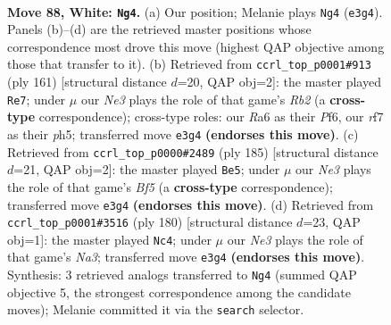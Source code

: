 \documentclass[11pt]{article}
\begin{document}
\clearpage

\begin{figure}[p]\centering
\begin{subfigure}{0.46\textwidth}\centering
\resizebox{\linewidth}{!}{%
\newchessgame
\chessboard[
  setfen={1R6/5rbk/R1P5/8/7K/4N3/8/8 w - - 15 88},
  showmover=false,
  pgfstyle=straightmove, color=movearrow, markmove={e3-g4}
]}
\caption{}
\end{subfigure}\hfill
\begin{subfigure}{0.46\textwidth}\centering
\resizebox{\linewidth}{!}{%
\newchessgame
\chessboard[
  setfen={4R3/1r6/3k1p1p/7P/6B1/6K1/8/8 b - - 24 81},
  showmover=false,
  pgfstyle=straightmove, color=movearrow, markmove={b7-e7}
]}
\caption{}
\end{subfigure}
\\[4pt]
\begin{subfigure}{0.46\textwidth}\centering
\resizebox{\linewidth}{!}{%
\newchessgame
\chessboard[
  setfen={8/8/8/5k2/3r1b2/1K4p1/4R1B1/8 b - - 13 93},
  showmover=false,
  pgfstyle=straightmove, color=movearrow, markmove={f4-e5}
]}
\caption{}
\end{subfigure}\hfill
\begin{subfigure}{0.46\textwidth}\centering
\resizebox{\linewidth}{!}{%
\newchessgame
\chessboard[
  setfen={8/k7/7R/6r1/1P6/NK6/8/6b1 w - - 5 91},
  showmover=false,
  pgfstyle=straightmove, color=movearrow, markmove={a3-c4}
]}
\caption{}
\end{subfigure}
\caption{\textbf{Move 88, White: \texttt{Ng4}.} (a) Our position; Melanie plays \texttt{Ng4} (\texttt{e3g4}). Panels (b)--(d) are the retrieved master positions whose correspondence most drove this move (highest QAP objective among those that transfer to it). (b) Retrieved from \texttt{ccrl\_top\_p0001\#913} (ply 161) [structural distance $d$=20, QAP obj=2]: the master played \texttt{Re7}; under $\mu$ our \emph{Ne3} plays the role of that game's \emph{Rb2} (a \textbf{cross-type} correspondence); cross-type roles: our \emph{R}a6 as their \emph{P}f6, our \emph{r}f7 as their \emph{p}h5; transferred move \texttt{e3g4} \textbf{(endorses this move)}. (c) Retrieved from \texttt{ccrl\_top\_p0000\#2489} (ply 185) [structural distance $d$=21, QAP obj=2]: the master played \texttt{Be5}; under $\mu$ our \emph{Ne3} plays the role of that game's \emph{Bf5} (a \textbf{cross-type} correspondence); transferred move \texttt{e3g4} \textbf{(endorses this move)}. (d) Retrieved from \texttt{ccrl\_top\_p0001\#3516} (ply 180) [structural distance $d$=23, QAP obj=1]: the master played \texttt{Nc4}; under $\mu$ our \emph{Ne3} plays the role of that game's \emph{Na3}; transferred move \texttt{e3g4} \textbf{(endorses this move)}. Synthesis: 3 retrieved analogs transferred to \texttt{Ng4} (summed QAP objective 5, the strongest correspondence among the candidate moves); Melanie committed it via the \texttt{search} selector.}
\label{fig:thought-m174}
\end{figure}
\end{document}
